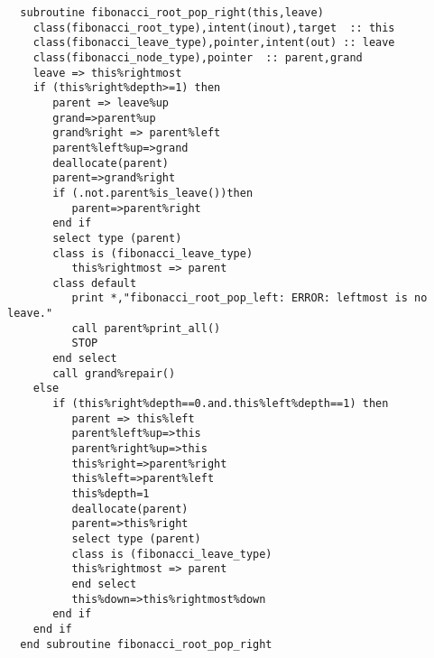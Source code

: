 \begin{Verbatim}
  subroutine fibonacci_root_pop_right(this,leave)
    class(fibonacci_root_type),intent(inout),target  :: this
    class(fibonacci_leave_type),pointer,intent(out) :: leave
    class(fibonacci_node_type),pointer  :: parent,grand
    leave => this%rightmost
    if (this%right%depth>=1) then
       parent => leave%up
       grand=>parent%up
       grand%right => parent%left
       parent%left%up=>grand
       deallocate(parent)
       parent=>grand%right
       if (.not.parent%is_leave())then
          parent=>parent%right
       end if
       select type (parent)
       class is (fibonacci_leave_type)
          this%rightmost => parent
       class default
          print *,"fibonacci_root_pop_left: ERROR: leftmost is no leave."
          call parent%print_all()
          STOP
       end select
       call grand%repair()
    else
       if (this%right%depth==0.and.this%left%depth==1) then
          parent => this%left
          parent%left%up=>this
          parent%right%up=>this
          this%right=>parent%right
          this%left=>parent%left
          this%depth=1
          deallocate(parent)
          parent=>this%right
          select type (parent)
          class is (fibonacci_leave_type)
          this%rightmost => parent
          end select
          this%down=>this%rightmost%down
       end if
    end if
  end subroutine fibonacci_root_pop_right
\end{Verbatim}

